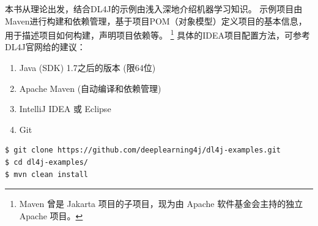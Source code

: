 本书从理论出发，结合DL4J的示例由浅入深地介绍机器学习知识。
示例项目由Maven进行构建和依赖管理，基于项目POM（对象模型）定义项目的基本信息，
用于描述项目如何构建，声明项目依赖等。
\footnote{Maven 曾是 Jakarta 项目的子项目，现为由 Apache 软件基金会主持的独立 Apache 项目。}
具体的IDEA项目配置方法，可参考DL4J官网给的建议：

\begin{enumerate}
	\item Java (SDK) 1.7之后的版本 (限64位)
	\item Apache Maven (自动编译和依赖管理)
  \item IntelliJ IDEA 或 Eclipse
  \item Git
\end{enumerate}

\begin{lstlisting}
$ git clone https://github.com/deeplearning4j/dl4j-examples.git
$ cd dl4j-examples/
$ mvn clean install
\end{lstlisting}